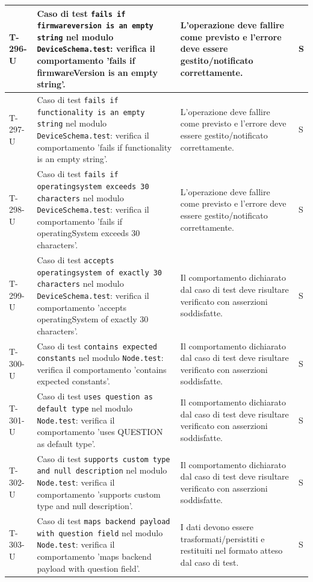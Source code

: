 \documentclass[a4paper,12pt]{article}
\begin{document}
{{\begin{longtable}{|>{\RaggedRight\arraybackslash}p{1.55cm}|>{\RaggedRight\arraybackslash}p{8.0cm}|>{\RaggedRight\arraybackslash}p{4.6cm}|>{\RaggedRight\arraybackslash}p{1.2cm}|}
        \hline
        T-296-U & Caso di test \texttt{fails if firmwareversion is an empty string} nel modulo \texttt{DeviceSchema.test}: verifica il comportamento 'fails if firmwareVersion is an empty string'. & L'operazione deve fallire come previsto e l'errore deve essere gestito/notificato correttamente. & S \\
        \hline
        T-297-U & Caso di test \texttt{fails if functionality is an empty string} nel modulo \texttt{DeviceSchema.test}: verifica il comportamento 'fails if functionality is an empty string'. & L'operazione deve fallire come previsto e l'errore deve essere gestito/notificato correttamente. & S \\
        \hline
        T-298-U & Caso di test \texttt{fails if operatingsystem exceeds 30 characters} nel modulo \texttt{DeviceSchema.test}: verifica il comportamento 'fails if operatingSystem exceeds 30 characters'. & L'operazione deve fallire come previsto e l'errore deve essere gestito/notificato correttamente. & S \\
        \hline
        T-299-U & Caso di test \texttt{accepts operatingsystem of exactly 30 characters} nel modulo \texttt{DeviceSchema.test}: verifica il comportamento 'accepts operatingSystem of exactly 30 characters'. & Il comportamento dichiarato dal caso di test deve risultare verificato con asserzioni soddisfatte. & S \\
        \hline
        T-300-U & Caso di test \texttt{contains expected constants} nel modulo \texttt{Node.test}: verifica il comportamento 'contains expected constants'. & Il comportamento dichiarato dal caso di test deve risultare verificato con asserzioni soddisfatte. & S \\
        \hline
        T-301-U & Caso di test \texttt{uses question as default type} nel modulo \texttt{Node.test}: verifica il comportamento 'uses QUESTION as default type'. & Il comportamento dichiarato dal caso di test deve risultare verificato con asserzioni soddisfatte. & S \\
        \hline
        T-302-U & Caso di test \texttt{supports custom type and null description} nel modulo \texttt{Node.test}: verifica il comportamento 'supports custom type and null description'. & Il comportamento dichiarato dal caso di test deve risultare verificato con asserzioni soddisfatte. & S \\
        \hline
        T-303-U & Caso di test \texttt{maps backend payload with question field} nel modulo \texttt{Node.test}: verifica il comportamento 'maps backend payload with question field'. & I dati devono essere trasformati/persistiti e restituiti nel formato atteso dal caso di test. & S \\

\end{longtable}}}
\end{document}
